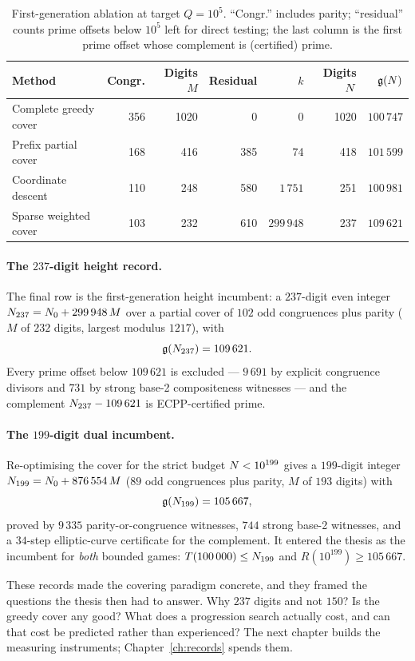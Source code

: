 \begin{table}[h]
\centering\small
\caption{First-generation ablation at target $Q=10^5$. ``Congr.''
includes parity; ``residual'' counts prime offsets below $10^5$ left
for direct testing; the last column is the first prime offset whose
complement is (certified) prime.}\label{tab:ablation}
\begin{tabular}{lrrrrrr}
\toprule
Method & Congr. & Digits $M$ & Residual & $k$ & Digits $N$ & $\mathfrak{g}(N)$\\
\midrule
Complete greedy cover & 356 & 1020 & 0 & 0 & 1020 & $100\,747$\\
Prefix partial cover & 168 & 416 & 385 & 74 & 418 & $101\,599$\\
Coordinate descent & 110 & 248 & 580 & $1\,751$ & 251 & $100\,981$\\
Sparse weighted cover & 103 & 232 & 610 & $299\,948$ & 237 & $109\,621$\\
\bottomrule
\end{tabular}
\end{table}

\paragraph{The $237$-digit height record.} The final row is the
first-generation height incumbent: a $237$-digit even integer
$N_{237}=N_0+299\,948\,M$ over a partial cover of $102$ odd
congruences plus parity ($M$ of $232$ digits, largest modulus $1217$),
with
\[
\mathfrak{g}(N_{237})=109\,621.
\]
Every prime offset below $109\,621$ is excluded --- $9\,691$ by explicit
congruence divisors and $731$ by strong base-2 compositeness witnesses
--- and the complement $N_{237}-109\,621$ is ECPP-certified prime.

\paragraph{The $199$-digit dual incumbent.} Re-optimising the cover for
the strict budget $N<10^{199}$ gives a $199$-digit integer
$N_{199}=N_0+876\,554\,M$ ($89$ odd congruences plus parity, $M$ of
$193$ digits) with
\[
\mathfrak{g}(N_{199})=105\,667,
\]
proved by $9\,335$ parity-or-congruence witnesses, $744$ strong base-2
witnesses, and a $34$-step elliptic-curve certificate for the
complement. It entered the thesis as the incumbent for \emph{both}
bounded games: $T(100\,000)\le N_{199}$ and $R(10^{199})\ge105\,667$.

\medskip
These records made the covering paradigm concrete, and they framed the
questions the thesis then had to answer. Why $237$ digits and not $150$?
Is the greedy cover any good? What does a progression search actually
cost, and can that cost be predicted rather than experienced? The next
chapter builds the measuring instruments; Chapter~\ref{ch:records}
spends them.
